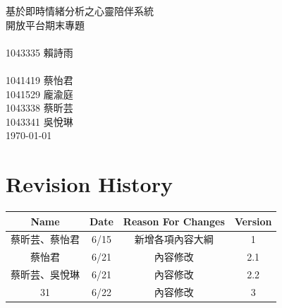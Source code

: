 \documentclass[12pt]{scrreprt}
\date{}
\def\myversion{1.0 }
\begin{document}
\CJKindent
\begin{center}
    \begin{bfseries}
        \Huge{基於即時情緒分析之心靈陪伴系統}\\
         \vspace{2cm}
		開放平台期末專題\\
	 \vspace{2cm}
         {\\}
		{\huge1043335 賴詩雨\\}
	\vspace{1cm}
         {\\}
		{\huge1041419 蔡怡君\\
		1041529 龐渝庭\\
		1043338 蔡昕芸\\
		1043341 吳悅琳\\}
	\vspace{2cm}
		{\huge\today\\}
    \end{bfseries}
\end{center}

\tableofcontents


\chapter*{Revision History}

\begin{center}
    \begin{tabular}{|c|c|c|c|}
        \hline
	    Name & Date & Reason For Changes & Version\\
        \hline
	    蔡昕芸、蔡怡君 & 6/15 & 新增各項內容大綱 & 1\\
        \hline
	    蔡怡君 & 6/21 & 內容修改 & 2.1\\
        \hline
	    蔡昕芸、吳悅琳 & 6/21 & 內容修改 & 2.2\\
        \hline
	    31 & 6/22 & 內容修改 & 3\\
        \hline
    \end{tabular}
\end{center}
\end{document}
